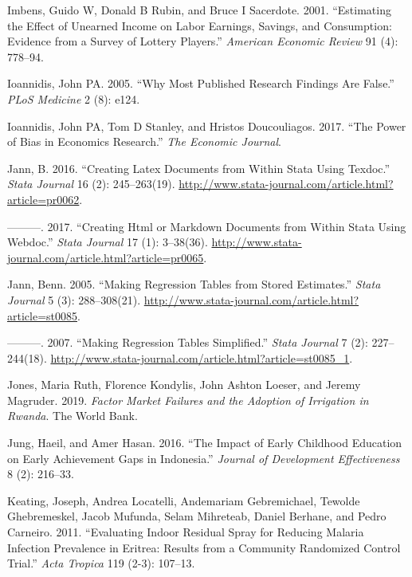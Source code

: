 \documentclass[
]{book}
\begin{document}
\leavevmode\hypertarget{ref-imbens2001estimating}{}%
Imbens, Guido W, Donald B Rubin, and Bruce I Sacerdote. 2001. ``Estimating the Effect of Unearned Income on Labor Earnings, Savings, and Consumption: Evidence from a Survey of Lottery Players.'' \emph{American Economic Review} 91 (4): 778--94.

\leavevmode\hypertarget{ref-ioannidis2005most}{}%
Ioannidis, John PA. 2005. ``Why Most Published Research Findings Are False.'' \emph{PLoS Medicine} 2 (8): e124.

\leavevmode\hypertarget{ref-ioannidis2017power}{}%
Ioannidis, John PA, Tom D Stanley, and Hristos Doucouliagos. 2017. ``The Power of Bias in Economics Research.'' \emph{The Economic Journal}.

\leavevmode\hypertarget{ref-pr0062}{}%
Jann, B. 2016. ``Creating Latex Documents from Within Stata Using Texdoc.'' \emph{Stata Journal} 16 (2): 245--263(19). \url{http://www.stata-journal.com/article.html?article=pr0062}.

\leavevmode\hypertarget{ref-pr0065}{}%
---------. 2017. ``Creating Html or Markdown Documents from Within Stata Using Webdoc.'' \emph{Stata Journal} 17 (1): 3--38(36). \url{http://www.stata-journal.com/article.html?article=pr0065}.

\leavevmode\hypertarget{ref-estout05}{}%
Jann, Benn. 2005. ``Making Regression Tables from Stored Estimates.'' \emph{Stata Journal} 5 (3): 288--308(21). \url{http://www.stata-journal.com/article.html?article=st0085}.

\leavevmode\hypertarget{ref-estout07}{}%
---------. 2007. ``Making Regression Tables Simplified.'' \emph{Stata Journal} 7 (2): 227--244(18). \url{http://www.stata-journal.com/article.html?article=st0085_1}.

\leavevmode\hypertarget{ref-jones2019factor}{}%
Jones, Maria Ruth, Florence Kondylis, John Ashton Loeser, and Jeremy Magruder. 2019. \emph{Factor Market Failures and the Adoption of Irrigation in Rwanda}. The World Bank.

\leavevmode\hypertarget{ref-jung2016impact}{}%
Jung, Haeil, and Amer Hasan. 2016. ``The Impact of Early Childhood Education on Early Achievement Gaps in Indonesia.'' \emph{Journal of Development Effectiveness} 8 (2): 216--33.

\leavevmode\hypertarget{ref-keating2011evaluating}{}%
Keating, Joseph, Andrea Locatelli, Andemariam Gebremichael, Tewolde Ghebremeskel, Jacob Mufunda, Selam Mihreteab, Daniel Berhane, and Pedro Carneiro. 2011. ``Evaluating Indoor Residual Spray for Reducing Malaria Infection Prevalence in Eritrea: Results from a Community Randomized Control Trial.'' \emph{Acta Tropica} 119 (2-3): 107--13.
\end{document}
